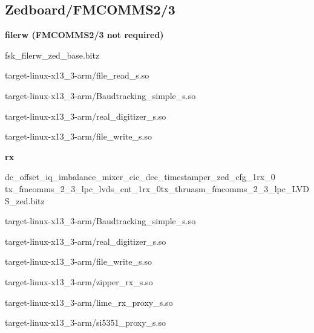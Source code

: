 \subsection{Zedboard/FMCOMMS2/3}
	\noindent\textbf{filerw (FMCOMMS2/3 not required)}
	\begin{itemize}
	\begin{minipage}[t]{.5\textwidth}
	\item fsk\_filerw\_zed\_base.bitz
	\item target-linux-x13\_3-arm/file\_read\_s.so
	\item target-linux-x13\_3-arm/Baudtracking\_simple\_s.so
	\end{minipage}
	\begin{minipage}[t]{.5\textwidth}
	\item target-linux-x13\_3-arm/real\_digitizer\_s.so
	\item target-linux-x13\_3-arm/file\_write\_s.so
	\end{minipage}
	\end{itemize}

	\noindent\textbf{rx}
	\begin{itemize}
  \item dc\_offset\_iq\_imbalance\_mixer\_cic\_dec\_timestamper\_zed\_cfg\_1rx\_0\\
tx\_fmcomms\_2\_3\_lpc\_lvds\_cnt\_1rx\_0tx\_thruasm\_fmcomms\_2\_3\_lpc\_LVDS\_zed.bitz \\
	\begin{minipage}[t]{.5\textwidth}
	\item target-linux-x13\_3-arm/Baudtracking\_simple\_s.so
	\item target-linux-x13\_3-arm/real\_digitizer\_s.so
	\item target-linux-x13\_3-arm/file\_write\_s.so
	\end{minipage}
	\begin{minipage}[t]{.5\textwidth}
	\item target-linux-x13\_3-arm/zipper\_rx\_s.so
	\item target-linux-x13\_3-arm/lime\_rx\_proxy\_s.so
	\item target-linux-x13\_3-arm/si5351\_proxy\_s.so
	\end{minipage}
	\end{itemize}

